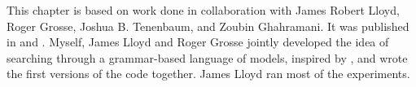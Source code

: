 
This chapter is based on work done in collaboration with James Robert Lloyd, Roger Grosse, Joshua B. Tenenbaum, and Zoubin Ghahramani.
It was published in \citep{DuvLloGroetal13} and \citep{LloDuvGroetal14}.
Myself, James Lloyd and Roger Grosse jointly developed the idea of searching through a grammar-based language of \gp{} models, inspired by \citet{grosse2012exploiting}, and wrote the first versions of the code together.
James Lloyd ran most of the experiments.




